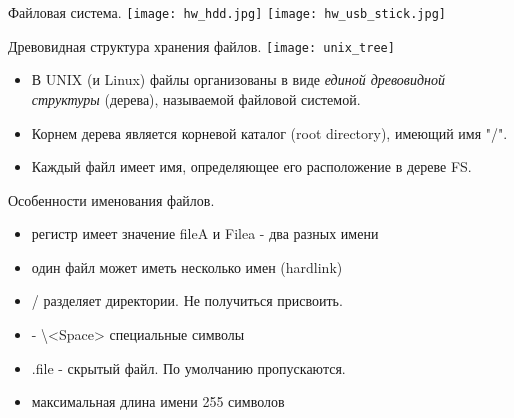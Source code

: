 \begin{frame}{Файловая система.}
\texttt{[image: hw\_hdd.jpg]} 
\texttt{[image: hw\_usb\_stick.jpg]} 
\end{frame}

\begin{frame}{Древовидная структура хранения файлов.}
\texttt{[image: unix\_tree]} 
  \begin{itemize}
    \item В UNIX (и Linux) файлы организованы в виде \emph{единой древовидной структуры} (дерева), называемой \alert{файловой системой}.
    \item Корнем дерева является \alert{корневой каталог} (root directory), имеющий имя \alert{"/"}.
    \item Каждый файл имеет \alert{имя}, определяющее его расположение в дереве FS.
  \end{itemize}
\end{frame}


\begin{frame}[fragile]{Особенности именования файлов.}

                \begin{itemize}
                    \item регистр имеет значение \alert{fileA} и \alert{Filea} - два разных имени
                    \item один файл может иметь \alert{несколько} имен (hardlink) 
                    \item \alert{/} разделяет директории. Не получиться присвоить.
                    \item \alert{- \textbackslash <Space>} специальные символы 
                    \item \alert{.}file - скрытый файл. По умолчанию пропускаются.
                    \item максимальная длина имени \alert{255} символов
                \end{itemize}
\end{frame}

